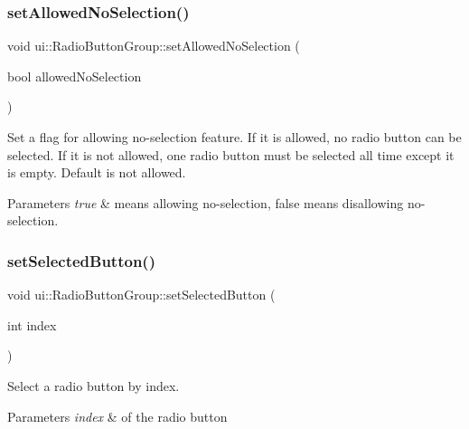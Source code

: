 \subsubsection{\texorpdfstring{set\+Allowed\+No\+Selection()}{setAllowedNoSelection()}\hspace{0.1cm}{\footnotesize\ttfamily [2/2]}}
{\footnotesize\ttfamily void ui\+::\+Radio\+Button\+Group\+::set\+Allowed\+No\+Selection (\begin{DoxyParamCaption}\item[{bool}]{allowed\+No\+Selection }\end{DoxyParamCaption})}

Set a flag for allowing no-\/selection feature. If it is allowed, no radio button can be selected. If it is not allowed, one radio button must be selected all time except it is empty. Default is not allowed.


\begin{DoxyParams}{Parameters}
{\em true} & means allowing no-\/selection, false means disallowing no-\/selection. \\
\hline
\end{DoxyParams}
\mbox{\label{classui_1_1RadioButtonGroup_aac8fb7403ae09cf11e9e830ad86ad721}} 
\subsubsection{\texorpdfstring{set\+Selected\+Button()}{setSelectedButton()}\hspace{0.1cm}{\footnotesize\ttfamily [1/4]}}
{\footnotesize\ttfamily void ui\+::\+Radio\+Button\+Group\+::set\+Selected\+Button (\begin{DoxyParamCaption}\item[{int}]{index }\end{DoxyParamCaption})\hspace{0.3cm}{\ttfamily [virtual]}}

Select a radio button by index.


\begin{DoxyParams}{Parameters}
{\em index} & of the radio button \\
\hline
\end{DoxyParams}
\mbox{\label{classui_1_1RadioButtonGroup_af3e9d8ac63f54d12e53b3196cb8e5e4e}} 

